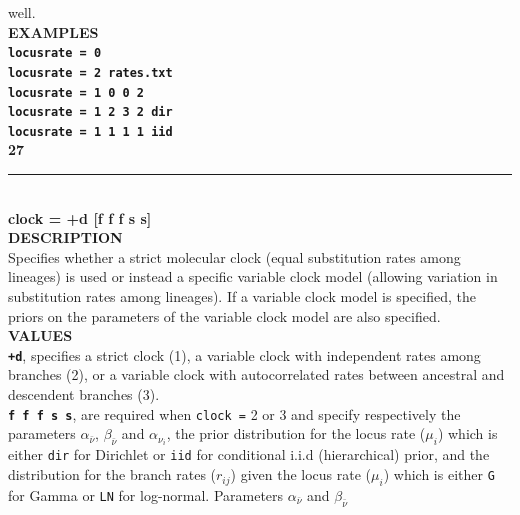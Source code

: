 \documentclass{book}
\numberwithin{equation}{section} \renewcommand{\baselinestretch}{0.55}
\begin{document}
well.
\vspace{5pt}\\
\textbf{EXAMPLES} \vspace{5pt}\\
\textbf{\texttt{locusrate = 0}} \vspace{5pt}\\
\textbf{\texttt{locusrate = 2 rates.txt}}\vspace{5pt}\\
\textbf{\texttt{locusrate = 1 0 0 2}} \vspace{5pt}\\
\textbf{\texttt{locusrate = 1 2 3 2 dir}} \vspace{5pt}\\
\textbf{\texttt{locusrate = 1 1 1 1 iid}} \vspace{10pt}\\
\textbf{{\large 27}} \\
\noindent\rule{\textwidth}{0.8pt} \\
\textbf{{\Large clock = +d [f f f s s] }} \vspace{5pt}\\
\textbf{DESCRIPTION} \vspace{5pt}\\
Specifies whether a strict molecular clock (equal substitution rates
among lineages) is used or instead a specific variable clock model
(allowing variation in substitution rates among lineages).  If a
variable clock model is specified, the priors on the parameters of the
variable clock model
are also specified.\vspace{5pt}\\
\textbf{VALUES} \vspace{5pt}\\
\textbf{\texttt{+d}}, specifies a strict clock (1), a variable clock
with independent rates among branches (2), or a variable clock with
autocorrelated rates between ancestral and descendent branches (3).
\vspace{5pt}\\
\textbf{\texttt{f f f s s}}, are required when \texttt{clock =} 2 or 3
and specify respectively the parameters $\alpha_{\bar{\nu}}$,
$\beta_{\bar{\nu}}$ and $\alpha_{\nu_i}$, the prior distribution for
the locus rate ($\mu_i$) which is either \texttt{dir} for Dirichlet or
\texttt{iid} for conditional i.i.d (hierarchical) prior, and the
distribution for the branch rates ($r_{ij}$) given the locus rate
($\mu_i$) which is either \texttt{G} for Gamma or \texttt{LN} for
log-normal. Parameters $\alpha_{\bar{\nu}}$ and $\beta_{\bar{\nu}}$
\end{document}
